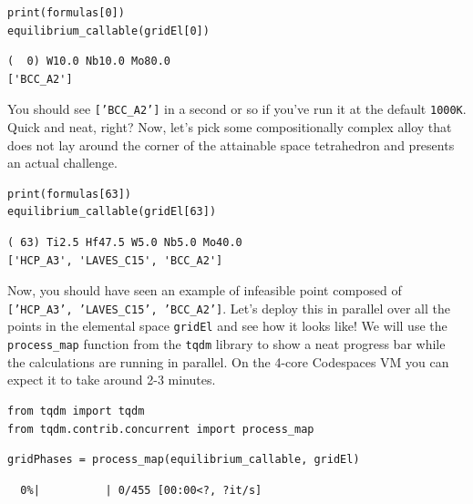 \begin{verbatim}
print(formulas[0])
equilibrium_callable(gridEl[0])
\end{verbatim}

\begin{verbatim}
(  0) W10.0 Nb10.0 Mo80.0 
['BCC_A2']
\end{verbatim}

You should see \texttt{['BCC\_A2']} in a second or so
if you've run it at the default \texttt{1000K}. Quick
and neat, right? Now, let's pick some compositionally complex alloy that
does not lay around the corner of the attainable space tetrahedron and
presents an actual challenge.

\begin{verbatim}
print(formulas[63])
equilibrium_callable(gridEl[63])
\end{verbatim}

\begin{verbatim}
( 63) Ti2.5 Hf47.5 W5.0 Nb5.0 Mo40.0 
['HCP_A3', 'LAVES_C15', 'BCC_A2']
\end{verbatim}

Now, you should have seen an example of infeasible point composed of
\texttt{['HCP\_A3', 'LAVES\_C15', 'BCC\_A2']}. Let's
deploy this in parallel over all the points in the elemental space
\texttt{gridEl} and see how it looks like! We will use
the \texttt{process\_map} function from the
\texttt{tqdm} library to show a neat progress bar while
the calculations are running in parallel. On the 4-core Codespaces VM
you can expect it to take around 2-3 minutes.

\begin{verbatim}
from tqdm import tqdm
from tqdm.contrib.concurrent import process_map
\end{verbatim}

\begin{verbatim}
gridPhases = process_map(equilibrium_callable, gridEl)
\end{verbatim}

\begin{verbatim}
  0%|          | 0/455 [00:00<?, ?it/s]
\end{verbatim}

